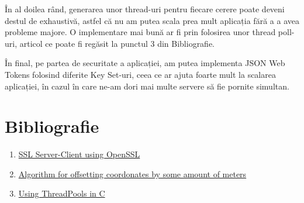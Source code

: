 \documentclass{article}
\begin{document}
În al doilea rând, generarea unor thread-uri pentru fiecare cerere poate deveni destul de exhaustivă, astfel că nu am putea scala prea mult aplicația fără a a avea probleme majore. O implementare mai bună ar fi prin folosirea unor thread poll-uri, articol ce poate fi regăsit la punctul 3 din Bibliografie. 

În final, pe partea de securitate a aplicației, am putea implementa JSON Web Tokens folosind diferite Key Set-uri, ceea ce ar ajuta foarte mult la scalarea aplicației, în cazul în care ne-am dori mai multe servere să fie pornite simultan.
\section{Bibliografie}
\begin{enumerate}
    \item   \href{https://aticleworld.com/ssl-server-client-using-openssl-in-c/}{SSL Server-Client using OpenSSL}
    \item   \href{https://gis.stackexchange.com/questions/2951/algorithm-for-offsetting-a-latitude-longitude-by-some-amount-of-meters}{Algorithm for offsetting coordonates by some amount of meters}
    \item   \href{https://nachtimwald.com/2019/04/12/thread-pool-in-c/}{Using ThreadPools in C}
\end{enumerate}
\end{document}
